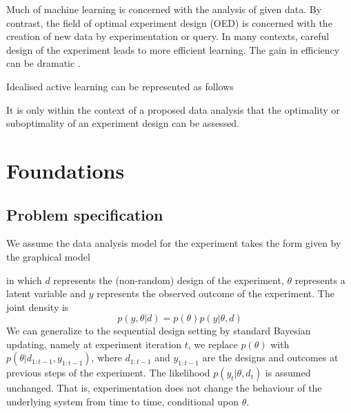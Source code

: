 Much of machine learning is concerned with the analysis of given data. By contrast, the field of optimal experiment design (OED) is concerned with the creation of new data by experimentation or query. In many contexts, careful design of the experiment leads to more efficient learning. The gain in efficiency can be dramatic \cite{myung2013}.

Idealised active learning can be represented as follows
\begin{center}
\end{center}
It is only within the context of a proposed data analysis that the optimality or suboptimality of an experiment design can be assessed.

\section{Foundations}
\subsection{Problem specification}
We assume the data analysis model for the experiment takes the form given by the graphical model
\begin{center}
\end{center}
in which $d$ represents the (non-random) design of the experiment, $\theta$ represents a latent variable and $y$ represents the observed outcome of the experiment. The joint density is
\begin{equation}
	p(y, \theta | d) = p(\theta)p(y|\theta,d)
\end{equation}
We can generalize to the sequential design setting by 
standard Bayesian updating, namely at experiment iteration $t$, we replace $p(\theta)$ with 
$p(\theta | d_{1:t-1}, y_{1:t-1})$, where $d_{1:t-1}$ and  $y_{1:t-1}$ are the designs and outcomes at previous steps of the experiment.
The likelihood $p(y_t | \theta, d_t)$ is assumed unchanged. That is, experimentation does not change the behaviour of the underlying system from time to time, conditional upon $\theta$.


